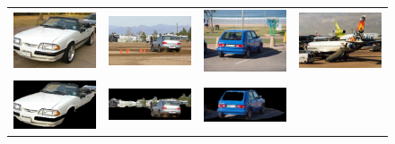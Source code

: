\documentclass[10pt,twocolumn,letterpaper]{article}
\begin{document}
\begin{figure}[p]
\centering
\begin{tabular}{ p{4cm} p{4cm} p{4cm} p{4cm} }
\includegraphics[width=3.95cm]{figures/add_res/car/2008_007064.jpg.eps} &
\includegraphics[width=3.95cm]{figures/add_res/car/2008_000052.jpg.eps} &
\includegraphics[width=3.95cm]{figures/add_res/car/2008_007171.jpg.eps} &
\includegraphics[width=3.95cm]{figures/add_res/car/2008_000251.jpg.eps} \\
\includegraphics[width=3.95cm]{figures/add_res/car/2008_007064.jpg_1_good.jpg.eps} &
\includegraphics[width=3.95cm]{figures/add_res/car/2008_000052.jpg_1_good.jpg.eps} &
\includegraphics[width=3.95cm]{figures/add_res/car/2008_007171.jpg_1_good.jpg.eps} &

\end{tabular}
\end{figure}
\end{document}
